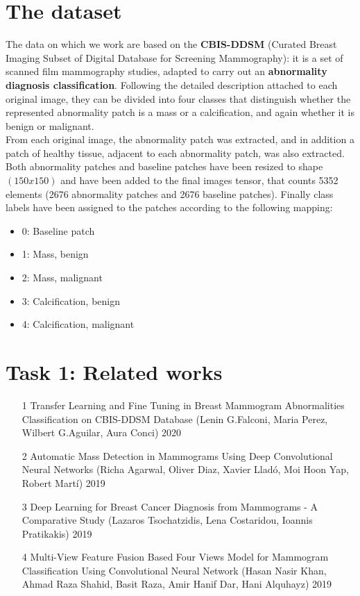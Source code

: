 \documentclass[11pt,a4paper,oneside]{article}
\begin{document}
\section{The dataset}
The data on which we work are based on the \textbf{CBIS-DDSM} (Curated Breast Imaging Subset of Digital Database for Screening Mammography): it is a set of scanned film mammography studies, adapted to carry out an \textbf{abnormality diagnosis classification}. Following the detailed description attached to each original image, they can be divided into four classes that distinguish whether the represented abnormality patch is a mass or a calcification, and again whether it is benign or malignant. \\
From each original image, the abnormality patch was extracted, and in addition a patch of healthy tissue, adjacent to each abnormality patch, was also extracted. Both abnormality patches and baseline patches have been resized to shape $(150x150)$ and have been added to the final images tensor, that counts 5352 elements (2676 abnormality patches and 2676 baseline patches).
Finally class labels have been assigned to the patches according to the following mapping:
\begin{itemize}
\item 0: Baseline patch
\item 1: Mass, benign
\item 2: Mass, malignant
\item 3: Calcification, benign
\item 4: Calcification, malignant
\end{itemize}

\section{Task 1: Related works}
\begin{itemize}
\item [1] Transfer Learning and Fine Tuning in Breast Mammogram Abnormalities Classification on CBIS-DDSM Database (Lenin G.Falconi, Maria Perez, Wilbert G.Aguilar, Aura Conci) 2020
\item [2] Automatic Mass Detection in Mammograms Using Deep Convolutional Neural Networks (Richa Agarwal, Oliver Diaz, Xavier Lladó, Moi Hoon Yap, Robert Martí) 2019
\item [3] Deep Learning for Breast Cancer Diagnosis from Mammograms - A Comparative Study (Lazaros Tsochatzidis, Lena Costaridou, Ioannis Pratikakis) 2019
\item [4] Multi-View Feature Fusion Based Four Views Model for Mammogram Classification Using Convolutional Neural Network (Hasan Nasir Khan, Ahmad Raza Shahid, Basit Raza,
Amir Hanif Dar, Hani Alquhayz) 2019
\end{itemize}
\end{document}
